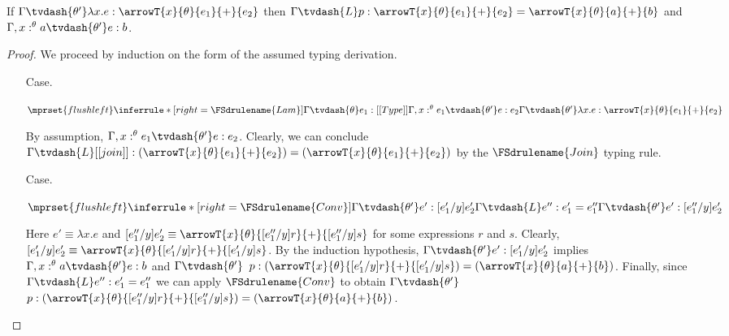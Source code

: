 \begin{lemma}[Inversion]
  \label{lemma:inversion}
  If $\Gamma \tvdash{\theta'} \lambda x.e:\arrowT{x}{\theta}{e_1}{+}{e_2}$ 
  then 
  $\Gamma \tvdash{L} p:\arrowT{x}{\theta}{e_1}{+}{e_2} = \arrowT{x}{\theta}{a}{+}{b}$
  and
  $\Gamma,x:^\theta a \tvdash{\theta'} e:b$.
\end{lemma}
\begin{proof}
  We proceed by induction on the form of the assumed typing derivation.
  \begin{itemize}
  \item[Case.]\ \\
    \begin{center}
      \begin{math}
        $$\mprset{flushleft}
        \inferrule* [right=\FSdrulename{Lam}] {
          \Gamma \tvdash{\theta} e_1:[[Type]]
          \\\\
          \Gamma,x:^{\theta} e_1 \tvdash{\theta'} e:e_2
        }{\Gamma \tvdash{\theta'} \lambda x.e:\arrowT{x}{\theta}{e_1}{+}{e_2}}
      \end{math}
    \end{center}
    By assumption, $\Gamma,x:^{\theta} e_1 \tvdash{\theta'} e:e_2$.  Clearly, we can conclude
    $\Gamma \tvdash{L} [[join]]:(\arrowT{x}{\theta}{e_1}{+}{e_2}) = (\arrowT{x}{\theta}{e_1}{+}{e_2})$
    by the $\FSdrulename{Join}$ typing rule.
    
  \item[Case.]\ \\
    \begin{center}
      \begin{math}
        $$\mprset{flushleft}
        \inferrule* [right=\FSdrulename{Conv}] {
          \Gamma \tvdash{\theta'} e':[e'_1/y]e'_2
          \\\\
          \Gamma \tvdash{L} e'':e'_1 = e''_1
        }{\Gamma \tvdash{\theta'} e':[e''_1/y]e'_2}
      \end{math}
    \end{center}
    Here $e' \equiv \lambda x.e$ and 
    $[e''_1/y]e'_2 \equiv \arrowT{x}{\theta}{[e''_1/y]r}{+}{[e''_1/y]s}$ for some expressions $r$ and $s$.  Clearly,
    $[e'_1/y]e'_2 \equiv \arrowT{x}{\theta}{[e'_1/y]r}{+}{[e'_1/y]s}$.  By the induction
    hypothesis, $\Gamma \tvdash{\theta'} e':[e'_1/y]e'_2$ implies 
    $\Gamma,x:^\theta a \tvdash{\theta'} e:b$ and 
    $\Gamma \tvdash{\theta'} $
    $p:(\arrowT{x}{\theta}{[e'_1/y]r}{+}{[e'_1/y]s}) = (\arrowT{x}{\theta}{a}{+}{b})$.  Finally, 
    since $\Gamma \tvdash{L} e'':e'_1 = e''_1$ we can apply $\FSdrulename{Conv}$ to obtain
    $\Gamma \tvdash{\theta'} $
    $p:(\arrowT{x}{\theta}{[e''_1/y]r}{+}{[e''_1/y]s}) = (\arrowT{x}{\theta}{a}{+}{b})$.
  \end{itemize}
\end{proof}


